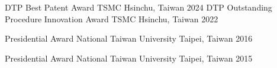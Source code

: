 
\begin{cvhonors}

  \cvhonor
    {DTP Best Patent Award}
    {TSMC}
    {Hsinchu, Taiwan}
    {2024}
  \cvhonor
    {DTP Outstanding Procedure Innovation Award}
    {TSMC}
    {Hsinchu, Taiwan}
    {2022}
    
  \cvhonor
    {Presidential Award} %
    {National Taiwan University} %
    {Taipei, Taiwan}
    {2016} %
    
  \cvhonor
    {Presidential Award} %
    {National Taiwan University} %
    {Taipei, Taiwan}
    {2015} %

\end{cvhonors}